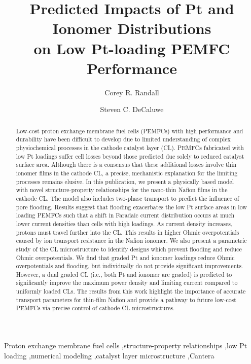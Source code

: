 \documentclass[final,3p,times,twocolumn]{elsarticle}    %
\begin{document}
\begin{frontmatter}

\title{Predicted Impacts of Pt and Ionomer Distributions \\ 
       on Low Pt-loading PEMFC Performance}

\author[CSM]{Corey R. Randall}
\author[CSM]{Steven C. DeCaluwe }
        
\address[CSM]{Colorado School of Mines, 1500 Illinois St, Golden, CO 80401}

\begin{abstract} 
Low-cost proton exchange membrane fuel cells (PEMFCs) with high performance and durability have been difficult to develop due to limited understanding of complex physiochemical processes in the cathode catalyst layer (CL). PEMFCs fabricated with low Pt loadings suffer cell losses beyond those predicted due solely to reduced catalyst surface area. Although there is a consensus that these additional losses involve thin ionomer films in the cathode CL, a precise, mechanistic explanation for the limiting processes remains elusive. In this publication, we present a physically based model with novel structure-property relationships for the nano-thin Nafion films in the cathode CL. The model also includes two-phase transport to predict the influence of pore flooding. Results suggest that flooding exacerbates the low Pt surface areas in low loading PEMFCs such that a shift in Faradaic current distribution occurs at much lower current densities than cells with high loadings. As current density increases, protons must travel further into the CL. This results in higher Ohmic overpotentials caused by ion transport resistance in the Nafion ionomer. We also present a parametric study of the CL microstructure to identify designs which prevent flooding and reduce Ohmic overpotentials. We find that graded Pt and ionomer loadings reduce Ohmic overpotentials and flooding, but individually do not provide significant improvements. However, a dual graded CL (i.e., both Pt and ionomer are graded) is predicted to significantly improve the maximum power density and limiting current compared to uniformly loaded CLs. The results from this work highlight the importance of accurate transport parameters for thin-film Nafion and provide a pathway to future low-cost PEMFCs via precise control of cathode CL microstructures.
\end{abstract}

\begin{keyword}
Proton exchange membrane fuel cells \sep structure-property relationships \sep low Pt loading \sep numerical modeling \sep catalyst layer microstructure \sep Cantera
\end{keyword}

\end{frontmatter}
\end{document}
